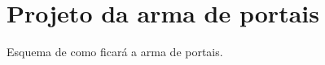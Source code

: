 

\chapter{Projeto da arma de portais}
\label{AP:Q_ExpreFaciais} %

Esquema de como ficará a arma de portais.




% 
